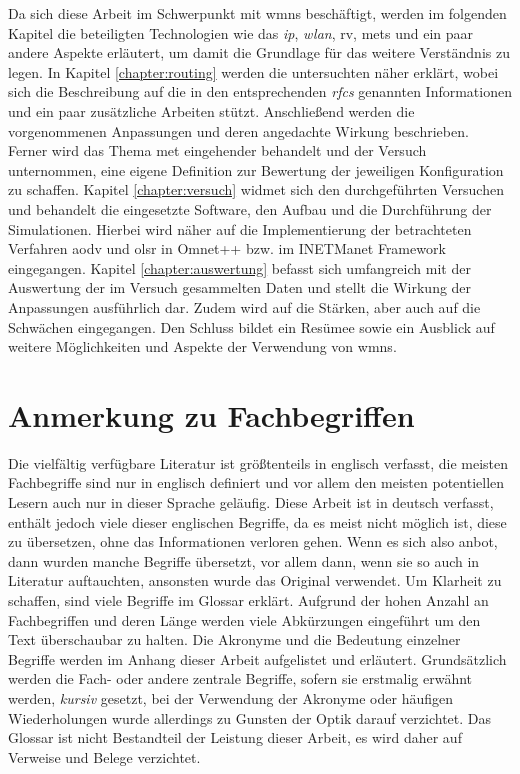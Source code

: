 Da sich diese Arbeit im Schwerpunkt mit \glspl{wmn} beschäftigt, werden im folgenden Kapitel die beteiligten Technologien wie das \textit{\gls{ip}}, \textit{\gls{wlan}}, \acrlong{rv}, \glspl{met} und ein paar andere Aspekte erläutert, um damit die Grundlage für das weitere Verständnis zu legen. In Kapitel \ref{chapter:routing} werden die untersuchten  näher erklärt, wobei sich die Beschreibung auf die in den entsprechenden \textit{\glspl{rfc}} genannten Informationen und ein paar zusätzliche Arbeiten stützt. Anschließend werden die vorgenommenen Anpassungen und deren angedachte Wirkung beschrieben. Ferner wird das Thema \gls{met} eingehender behandelt und der Versuch unternommen, eine eigene Definition zur Bewertung der jeweiligen Konfiguration zu schaffen. Kapitel \ref{chapter:versuch} widmet sich den durchgeführten Versuchen und behandelt die eingesetzte Software, den Aufbau und die Durchführung der Simulationen. Hierbei wird näher auf die Implementierung der betrachteten Verfahren \gls{aodv} und \gls{olsr} in Omnet++ bzw. im INETManet Framework eingegangen. Kapitel \ref{chapter:auswertung} befasst sich umfangreich mit der Auswertung der im Versuch gesammelten Daten und stellt die Wirkung der Anpassungen ausführlich dar. Zudem wird auf die Stärken, aber auch auf die Schwächen eingegangen. Den Schluss bildet ein Resümee sowie ein Ausblick auf weitere Möglichkeiten und Aspekte der Verwendung von \glspl{wmn}.

\section{Anmerkung zu Fachbegriffen}

Die vielfältig verfügbare Literatur ist größtenteils in englisch verfasst, die meisten Fachbegriffe sind nur in englisch definiert und vor allem den meisten potentiellen Lesern auch nur in dieser Sprache geläufig. Diese Arbeit ist in deutsch verfasst, enthält jedoch viele dieser englischen Begriffe, da es meist nicht möglich ist, diese zu übersetzen, ohne das Informationen verloren gehen. Wenn es sich also anbot, dann wurden manche Begriffe übersetzt, vor allem dann, wenn sie so auch in Literatur auftauchten, ansonsten wurde das Original verwendet. Um Klarheit zu schaffen, sind viele Begriffe im Glossar erklärt. Aufgrund der hohen Anzahl an Fachbegriffen und deren Länge werden viele Abkürzungen eingeführt um den Text überschaubar zu halten. Die Akronyme und die Bedeutung einzelner Begriffe werden im Anhang dieser Arbeit aufgelistet und erläutert. Grundsätzlich werden die Fach- oder andere zentrale Begriffe, sofern sie erstmalig erwähnt werden, \textit{kursiv} gesetzt, bei der Verwendung der Akronyme oder häufigen Wiederholungen wurde allerdings zu Gunsten der Optik darauf verzichtet. Das Glossar ist nicht Bestandteil der Leistung dieser Arbeit, es wird daher auf Verweise und Belege verzichtet.




